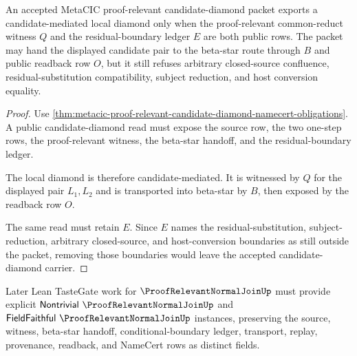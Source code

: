 \begin{theorem}\label{thm:metacic-proof-relevant-candidate-diamond-boundary}
An accepted MetaCIC proof-relevant candidate-diamond packet exports a candidate-mediated local diamond only when the proof-relevant common-reduct witness $Q$ and the residual-boundary ledger $E$ are both public rows. The packet may hand the displayed candidate pair to the beta-star route through $B$ and public readback row $O$, but it still refuses arbitrary closed-source confluence, residual-substitution compatibility, subject reduction, and host conversion equality.
\end{theorem}
\begin{proof}
Use \autoref{thm:metacic-proof-relevant-candidate-diamond-namecert-obligations}. A public candidate-diamond read must expose the source row, the two one-step rows, the proof-relevant witness, the beta-star handoff, and the residual-boundary ledger.

The local diamond is therefore candidate-mediated. It is witnessed by $Q$ for the displayed pair $L_1,L_2$ and is transported into beta-star by $B$, then exposed by the readback row $O$.

The same read must retain $E$. Since $E$ names the residual-substitution, subject-reduction, arbitrary closed-source, and host-conversion boundaries as still outside the packet, removing those boundaries would leave the accepted candidate-diamond carrier.
\end{proof}



Later Lean TasteGate work for $\ProofRelevantNormalJoinUp$ must provide explicit $\mathsf{Nontrivial}\ \ProofRelevantNormalJoinUp$ and $\mathsf{FieldFaithful}\ \ProofRelevantNormalJoinUp$ instances, preserving the source, witness, beta-star handoff, conditional-boundary ledger, transport, replay, provenance, readback, and NameCert rows as distinct fields.

